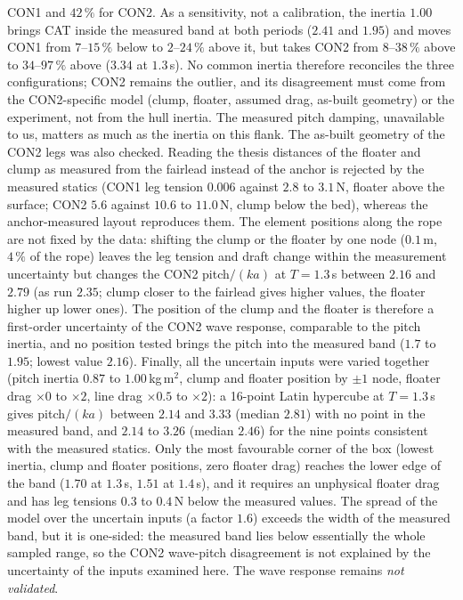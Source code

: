 \documentclass[11pt,a4paper]{article}
\begin{document}
CON1 and $42\,\%$ for CON2. As a sensitivity, not a calibration, the inertia $1.00$ brings CAT inside the measured band at both periods ($2.41$ and $1.95$) and moves CON1 from $7$--$15\,\%$ below to $2$--$24\,\%$ above it, but takes CON2 from $8$--$38\,\%$ above to $34$--$97\,\%$ above ($3.34$ at $1.3$\,s). No common inertia therefore reconciles the three configurations; CON2 remains the outlier, and its disagreement must come from the CON2-specific model (clump, floater, assumed drag, as-built geometry) or the experiment, not from the hull inertia. The measured pitch damping, unavailable to us, matters as much as the inertia on this flank. The as-built geometry of the CON2 legs was also checked. Reading the thesis distances of the floater and clump as measured from the fairlead instead of the anchor is rejected by the measured statics (CON1 leg tension $0.006$ against $2.8$ to $3.1$\,N, floater above the surface; CON2 $5.6$ against $10.6$ to $11.0$\,N, clump below the bed), whereas the anchor-measured layout reproduces them. The element positions along the rope are not fixed by the data: shifting the clump or the floater by one node ($0.1$\,m, $4\,\%$ of the rope) leaves the leg tension and draft change within the measurement uncertainty but changes the CON2 pitch$/(ka)$ at $T=1.3$\,s between $2.16$ and $2.79$ (as run $2.35$; clump closer to the fairlead gives higher values, the floater higher up lower ones). The position of the clump and the floater is therefore a first-order uncertainty of the CON2 wave response, comparable to the pitch inertia, and no position tested brings the pitch into the measured band ($1.7$ to $1.95$; lowest value $2.16$). Finally, all the uncertain inputs were varied together (pitch inertia $0.87$ to $1.00$\,kg\,m$^2$, clump and floater position by $\pm1$ node, floater drag $\times0$ to $\times2$, line drag $\times0.5$ to $\times2$): a 16-point Latin hypercube at $T=1.3$\,s gives pitch$/(ka)$ between $2.14$ and $3.33$ (median $2.81$) with no point in the measured band, and $2.14$ to $3.26$ (median $2.46$) for the nine points consistent with the measured statics. Only the most favourable corner of the box (lowest inertia, clump and floater positions, zero floater drag) reaches the lower edge of the band ($1.70$ at $1.3$\,s, $1.51$ at $1.4$\,s), and it requires an unphysical floater drag and has leg tensions $0.3$ to $0.4$\,N below the measured values. The spread of the model over the uncertain inputs (a factor $1.6$) exceeds the width of the measured band, but it is one-sided: the measured band lies below essentially the whole sampled range, so the CON2 wave-pitch disagreement is not explained by the uncertainty of the inputs examined here. The wave response remains \emph{not validated}.
\end{document}
